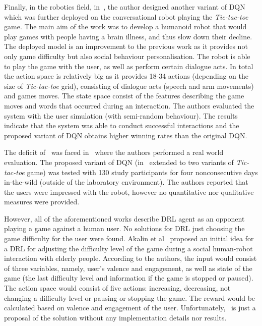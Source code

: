 \documentclass[thesis]{mas_proposal}
\begin{document}
Finally, in the robotics field, in~\cite{Cuayahuitl2017}, the author designed another variant of DQN which was further deployed on the conversational robot playing the \emph{Tic-tac-toe} game. The main aim of the work was to develop a humanoid robot that would play games with people having a brain illness, and thus slow down their decline. The deployed model is an improvement to the previous work as it provides not only game difficulty but also social behaviour personalisation. The robot is able to play the game with the user, as well as perform certain dialogue acts. In total the action space is relatively big as it provides 18-34 actions (depending on the size of \emph{Tic-tac-toe} grid), consisting of dialogue acts (speech and arm movements) and games moves. The state space consist of the features describing the game moves and words that occurred during an interaction. The authors evaluated the system with the user simulation (with semi-random behaviour). The results indicate that the system was able to conduct successful interactions and the proposed variant of DQN obtains higher winning rates than the original DQN.

The deficit of~\cite{Cuayahuitl2017} was faced in~\cite{Cuayahuitl2020} where the authors performed a real world evaluation. The proposed variant of DQN (in~\cite{Cuayahuitl2020} extended to two variants of \emph{Tic-tac-toe} game) was tested with 130 study participants for four nonconsecutive days in-the-wild (outside of the laboratory environment). The authors reported that the users were impressed  with the robot, however no quantitative nor qualitative measures were provided.

However, all of the aforementioned works describe DRL agent as an opponent playing a game against a human user. No solutions for DRL just choosing the game difficulty for the user were found. Akalin et al~\cite{Akalin2018} proposed an initial idea for a DRL for adjusting the difficulty level of the game during a social human-robot interaction with elderly people. According to the authors, the input would consist of three variables, namely, user's valence and engagement, as well as state of the game (the last difficulty level and information if the game is stopped or paused). The action space would consist of five actions: increasing, decreasing, not changing a difficulty level or pausing or stopping the game. The reward would be calculated based on valence and engagement of the user. Unfortunately,~\cite{Akalin2018} is just a proposal of the solution without any implementation details nor results. 
\end{document}
